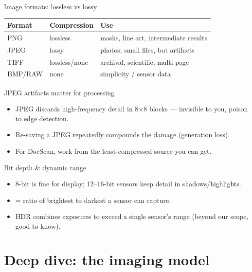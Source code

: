\documentclass[10pt,aspectratio=169]{beamer}
\begin{document}
\begin{frame}{Image formats: lossless vs lossy}
  \begin{center}
  \begin{tabular}{@{}lll@{}}
    \toprule
    \textbf{Format} & \textbf{Compression} & \textbf{Use} \\
    \midrule
    PNG & lossless & masks, line art, intermediate results \\
    JPEG & lossy & photos; small files, but artifacts \\
    TIFF & lossless/none & archival, scientific, multi-page \\
    BMP/RAW & none & simplicity / sensor data \\
    \bottomrule
  \end{tabular}
  \end{center}
\end{frame}

\begin{frame}{JPEG artifacts matter for processing}
  \begin{itemize}
    \item JPEG discards high-frequency detail in 8$\times$8 blocks — invisible to you, poison to edge detection.
    \item Re-saving a JPEG repeatedly compounds the damage (generation loss).
    \item For DocScan, work from the least-compressed source you can get.
  \end{itemize}
\end{frame}

\begin{frame}{Bit depth \& dynamic range}
  \begin{itemize}
    \item 8-bit is fine for display; 12--16-bit sensors keep detail in shadows/highlights.
    \item {} = ratio of brightest to darkest a sensor can capture.
    \item HDR combines exposures to exceed a single sensor's range (beyond our scope, good to know).
  \end{itemize}
\end{frame}

\section{Deep dive: the imaging model}
\end{document}
